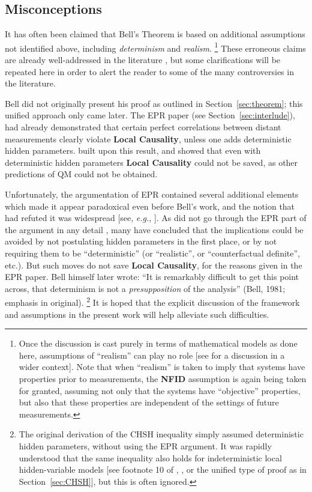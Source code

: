 \documentclass[onecolumn, nofootinbib, 12pt]{revtex4-1}
\begin{document}
\subsection{Misconceptions}
\label{sec:misconceptions}

It has often been claimed that Bell's Theorem is based on additional assumptions not identified above, including \emph{determinism} and \emph{realism}.%
\footnote{Once the discussion is cast purely in terms of mathematical models as done here, assumptions of ``realism'' can play no role [see \textcite{norsen2007} for a discussion in a wider context].  Note that when ``realism'' is taken to imply that systems have properties prior to measurements, the {\bf NFID} assumption is again being taken for granted, assuming not only that the systems have ``objective'' properties, but also that these properties are independent of the settings of future measurements.}
These erroneous claims are already well-addressed in the literature \cite{norsen2007, norsen2011, norsen2017, maudlin2010, maudlin2014}, but some clarifications will be repeated here in order to alert the reader to some of the many controversies in the literature.

Bell did not originally present his proof as outlined in Section~\ref{sec:theorem}; this unified approach only came later.  The EPR paper (see Section~\ref{sec:interlude}), had already demonstrated that certain perfect correlations between distant measurements clearly violate {\bf Local Causality}, unless one adds deterministic hidden parameters.  \textcite{bell1964} built upon this result, and showed that even with deterministic hidden parameters {\bf Local Causality} could not be saved, as other predictions of QM could not be obtained.

Unfortunately, the argumentation of EPR contained several additional elements which made it appear paradoxical even before Bell's work, and the notion that \textcite{bohr1935} had refuted it was widespread [see, \emph{e.g.}, \textcite{clauser1969}].  As \textcite{bell1964} did not
go through the EPR part of the argument in any detail \cite{wiseman2014,norsen2015}, many have concluded that the implications could be avoided by not postulating hidden parameters in the first place, or by not requiring them to be ``deterministic'' (or ``realistic'', or ``counterfactual definite'', etc.).  But such moves do not save {\bf Local Causality}, for the reasons given in the EPR paper.  Bell himself later wrote: ``It is remarkably difficult to get this point across, that determinism is not a \emph{presupposition} of the analysis'' (Bell, 1981; emphasis in original)\nocite{bell1981}.%
\footnote{
The original derivation of the CHSH inequality \cite{clauser1969} simply assumed deterministic hidden parameters, without using the EPR argument.  It was rapidly understood that the same inequality also holds for indeterministic local hidden-variable models [see footnote 10 of \textcite{bell1971}, \textcite{clauser1974}, or the unified type of proof as in Section~\ref{sec:CHSH}], but this is often ignored.}
It is hoped that the explicit discussion of the framework and assumptions in the present work will help alleviate such difficulties.
\end{document}
